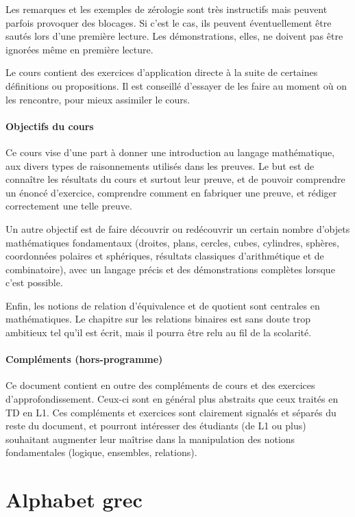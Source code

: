 \documentclass[11pt,a4paper]{book}
\theoremstyle{definition}
\theoremstyle{plain}
\begin{document}
Les remarques et les exemples de \og zérologie\fg{} sont très instructifs mais peuvent parfois provoquer des blocages. Si c'est le cas, ils peuvent éventuellement être sautés lors d'une première lecture. Les démonstrations, elles, ne doivent pas être ignorées même en première lecture.

Le cours contient des exercices d'application directe à la suite de certaines définitions ou propositions. Il est conseillé d'essayer de les faire au moment où on les rencontre, pour mieux assimiler le cours.

\paragraph{Objectifs du cours} Ce cours vise d'une part à donner une introduction au langage mathématique, aux divers types de raisonnements utilisés dans les preuves. Le but est de connaître les résultats du cours et surtout leur preuve, et de pouvoir comprendre un énoncé d'exercice, comprendre comment en fabriquer une preuve, et rédiger correctement une telle preuve. 

Un autre objectif est de faire découvrir ou redécouvrir un certain nombre d'objets mathématiques fondamentaux (droites, plans, cercles, cubes, cylindres, sphères, coordonnées polaires et sphériques, résultats classiques d'arithmétique et de combinatoire), avec un langage précis et des démonstrations complètes lorsque c'est possible.

Enfin, les notions de relation d'équivalence et de quotient sont centrales en mathématiques. Le chapitre sur les relations binaires est sans doute trop ambitieux tel qu'il est écrit, mais il pourra être relu au fil de la scolarité.

\paragraph{Compléments (hors-programme)} Ce document contient en outre des compléments de cours et des exercices d'approfondissement. Ceux-ci  sont en général plus abstraits que ceux traités en TD en L1. Ces compléments et exercices sont clairement signalés et séparés du reste du document, et pourront intéresser des étudiants (de L1 ou plus) souhaitant augmenter leur maîtrise dans la manipulation des notions fondamentales (logique, ensembles, relations).

\newpage
\section{Alphabet grec}
\end{document}
